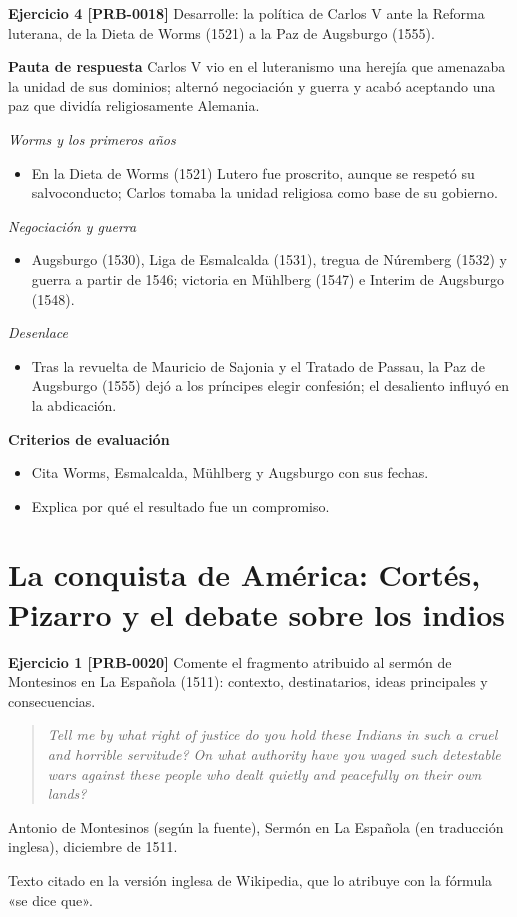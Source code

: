 \documentclass{book}
\begin{document}
\noindent\textbf{Ejercicio 4 [PRB-0018]}
Desarrolle: la política de Carlos V ante la Reforma luterana, de la Dieta de Worms (1521) a la Paz de Augsburgo (1555).


\noindent\textbf{Pauta de respuesta}
Carlos V vio en el luteranismo una herejía que amenazaba la unidad de sus dominios; alternó negociación y guerra y acabó aceptando una paz que dividía religiosamente Alemania.


\noindent\textit{Worms y los primeros años}
\begin{itemize}
\item En la Dieta de Worms (1521) Lutero fue proscrito, aunque se respetó su salvoconducto; Carlos tomaba la unidad religiosa como base de su gobierno.
\end{itemize}

\noindent\textit{Negociación y guerra}
\begin{itemize}
\item Augsburgo (1530), Liga de Esmalcalda (1531), tregua de Núremberg (1532) y guerra a partir de 1546; victoria en Mühlberg (1547) e Interim de Augsburgo (1548).
\end{itemize}

\noindent\textit{Desenlace}
\begin{itemize}
\item Tras la revuelta de Mauricio de Sajonia y el Tratado de Passau, la Paz de Augsburgo (1555) dejó a los príncipes elegir confesión; el desaliento influyó en la abdicación.
\end{itemize}

\noindent\textbf{Criterios de evaluación}
\begin{itemize}
\item Cita Worms, Esmalcalda, Mühlberg y Augsburgo con sus fechas.
\item Explica por qué el resultado fue un compromiso.
\end{itemize}

\section{La conquista de América: Cortés, Pizarro y el debate sobre los indios}

\noindent\textbf{Ejercicio 1 [PRB-0020]}
Comente el fragmento atribuido al sermón de Montesinos en La Española (1511): contexto, destinatarios, ideas principales y consecuencias.


\begin{quote}
\itshape Tell me by what right of justice do you hold these Indians in such a cruel and horrible servitude? On what authority have you waged such detestable wars against these people who dealt quietly and peacefully on their own lands?
\end{quote}
{\noindent\footnotesize Antonio de Montesinos (según la fuente), Sermón en La Española (en traducción inglesa), diciembre de 1511.\par}
{\noindent\footnotesize Texto citado en la versión inglesa de Wikipedia, que lo atribuye con la fórmula «se dice que».\par}
\end{document}
